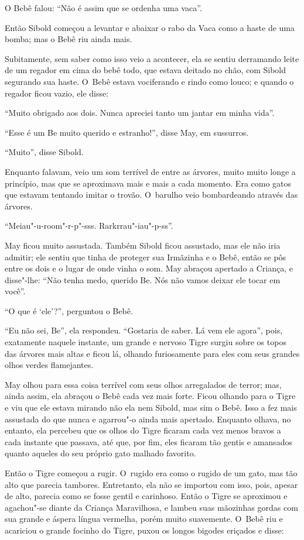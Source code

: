 O Bebê falou: ``Não é assim que se ordenha uma vaca''.
\ \


Então Sibold começou a levantar e abaixar o rabo da Vaca como a haste de
uma bomba; mas o Bebê riu ainda mais.

Subitamente, sem saber como isso veio a acontecer, ela se sentiu
derramando leite de um regador em cima do bebê todo, que estava deitado
no chão, com Sibold segurando sua haste. O~Bebê estava vociferando e
rindo como louco; e quando o regador ficou vazio, ele disse:

``Muito obrigado aos dois. Nunca apreciei tanto um jantar em minha
vida''.

``Esse é um Be muito querido e estranho!'', disse May, em sussurros.

``Muito'', disse Sibold.

Enquanto falavam, veio um som terrível de entre as árvores, muito muito
longe a princípio, mas que se aproximava mais e mais a cada momento. Era
como gatos que estavam tentando imitar o trovão. O~barulho veio
bombardeando através das árvores.

``Meiau"-u-room"-r-p"-sss. Rarkrrau"-iau"-p-ss''.

May ficou muito assustada. Também Sibold ficou assustado, mas ele não
iria admitir; ele sentiu que tinha de proteger sua Irmãzinha e o Bebê,
então se pôs entre os dois e o lugar de onde vinha o som. May abraçou
apertado a Criança, e disse"-lhe: ``Não tenha medo, querido Be. Nós não
vamos deixar ele tocar em você''.

``O que é `ele'?'', perguntou o Bebê.

``Eu não sei, Be'', ela respondeu. ``Gostaria de saber. Lá vem ele
agora'', pois, exatamente naquele instante, um grande e nervoso Tigre
surgiu sobre os topos das árvores mais altas e ficou lá, olhando
furiosamente para eles com seus grandes olhos verdes flamejantes.

May olhou para essa coisa terrível com seus olhos arregalados de terror;
mas, ainda assim, ela abraçou o Bebê cada vez mais forte. Ficou olhando
para o Tigre e viu que ele estava mirando não ela nem Sibold, mas sim o
Bebê. Isso a fez mais assustada do que nunca e agarrou"-o ainda mais
apertado. Enquanto olhava, no entanto, ela percebeu que os olhos do
Tigre ficaram cada vez menos bravos a cada instante que passava, até
que, por fim, eles ficaram tão gentis e amansados quanto aqueles do seu
próprio gato malhado favorito.

Então o Tigre começou a rugir. O~rugido era como o rugido de um gato,
mas tão alto que parecia tambores. Entretanto, ela não se importou com
isso, pois, apesar de alto, parecia como se fosse gentil e carinhoso.
Então o Tigre se aproximou e agachou"-se diante da Criança Maravilhosa, e
lambeu suas mãozinhas gordas com sua grande e áspera língua vermelha,
porém muito suavemente. O~Bebê riu e acariciou o grande focinho do
Tigre, puxou os longos bigodes eriçados e disse:

